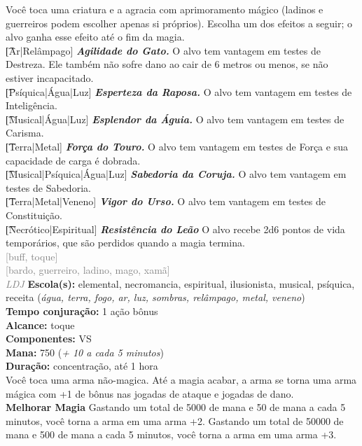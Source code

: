 \documentclass{RPG_Adventure}[2021/10/20]
\begin{document}
{\normalsize Você toca uma criatura e a agracia com aprimoramento mágico (ladinos e guerreiros podem escolher apenas si próprios). Escolha um dos efeitos a seguir; o alvo ganha esse efeito até o fim da magia.\\\t [Ar|Relâmpago] \textbf{\textit{Agilidade do Gato.}} O alvo tem vantagem em testes de Destreza. Ele também não sofre dano ao cair de 6 metros ou menos, se não estiver incapacitado.\\\t [Psíquica|Água|Luz] \textbf{\textit{Esperteza da Raposa.}} O alvo tem vantagem em testes de Inteligência.\\\t [Musical|Água|Luz] \textbf{\textit{Esplendor da Águia.}} O alvo tem vantagem em testes de Carisma.\\\t [Terra|Metal] \textbf{\textit{Força do Touro.}} O alvo tem vantagem em testes de Força e sua capacidade de carga é dobrada.  \\\t [Musical|Psíquica|Água|Luz] \textbf{\textit{Sabedoria da Coruja.}} O alvo tem vantagem em testes de Sabedoria.\\\t [Terra|Metal|Veneno] \textbf{\textit{Vigor do Urso.}} O alvo tem vantagem em testes de Constituição.\\\t [Necrótico|Espiritual] \textbf{\textit{Resistência do Leão}} O alvo recebe 2d6 pontos de vida temporários, que são perdidos quando a magia termina.\\}
{\scriptsize \textcolor{gray}{[buff, toque]\\}}
{\scriptsize \textcolor{gray}{[bardo, guerreiro, ladino, mago, xamã]\\}}
{\tiny \textcolor{gray}{\textit{LDJ}}}\jump{}
{\small \t \textbf{Escola(s):} elemental, necromancia, espiritual, ilusionista, musical, psíquica, receita (\textit{água, terra, fogo, ar, luz, sombras, relâmpago, metal, veneno})\\\t \textbf{Tempo conjuração:} 1 ação bônus\\\t \textbf{Alcance:} toque\\\t \textbf{Componentes:} VS\\\t \textbf{Mana:} 750 (\textit{+ 10 a cada 5 minutos})\\\t \textbf{Duração:} concentração, até 1 hora\\}
{\normalsize Você toca uma arma não-magica. Até a magia acabar, a arma se torna uma arma mágica com +1 de bônus nas jogadas de ataque e jogadas de dano.\\\t \textbf{Melhorar Magia} Gastando um total de 5000 de mana e 50 de mana a cada 5 minutos, você torna a arma em uma arma +2. Gastando um total de 50000 de mana e 500 de mana a cada 5 minutos, você torna a arma em uma arma +3.\\}
\end{document}
